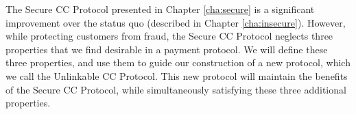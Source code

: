The Secure CC Protocol presented in Chapter \ref{cha:secure} is a significant improvement over the status quo (described in Chapter \ref{cha:insecure}).
However, while protecting customers from fraud, the Secure CC Protocol neglects three properties that we find desirable in a payment protocol.
We will define these three properties, and use them to guide our construction of a new protocol, which we call the Unlinkable CC Protocol.
This new protocol will maintain the benefits of the Secure CC Protocol, while simultaneously satisfying these three additional properties.
